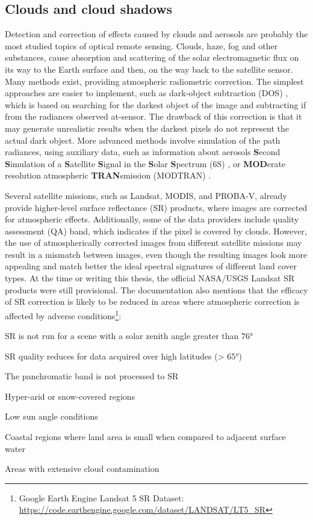 \subsection{Clouds and cloud shadows}

Detection and correction of effects caused by clouds and aerosols are probably the most studied topics of optical remote sensing. Clouds, haze, fog and other substances, cause absorption and scattering of the solar electromagnetic flux on its way to the Earth surface and then, on the way back to the satellite sensor. Many methods exist, providing atmospheric radiometric correction. The simplest approaches are easier to implement, such as dark-object subtraction (DOS) \citep{chavez1996image}, which is based on searching for the darkest object of the image and subtracting if from the radiances observed at-sensor. The drawback of this correction is that it may generate unrealistic results when the darkest pixels do not represent the actual dark object. More advanced methods involve simulation of the path radiances, using auxiliary data, such as information about aerosols \textbf{S}econd \textbf{S}imulation of a \textbf{S}atellite \textbf{S}ignal in the \textbf{S}olar \textbf{S}pectrum (6S) \citep{vermote1997second}, \citep{zhang2012improved} or \textbf{MOD}erate resolution atmospheric \textbf{TRAN}smission (MODTRAN) \citep{berk1987modtran}. 

Several satellite missions, such as Landsat, MODIS, and PROBA-V, already provide higher-level surface reflectance (SR) products, where images are corrected for atmospheric effects. Additionally, some of the data providers include quality assessment (QA) band, which indicates if the pixel is covered by clouds. However, the use of atmospherically corrected images from different satellite missions may result in a mismatch between images, even though the resulting images look more appealing and match better the ideal spectral signatures of different land cover types. At the time or writing this thesis, the official NASA/USGS Landsat SR products were still provisional. The documentation also mentions that the efficacy of SR correction is likely to be reduced in areas where atmospheric correction is affected by adverse conditions\footnote{Google Earth Engine Landsat 5 SR Dataset: \url{https://code.earthengine.google.com/dataset/LANDSAT/LT5\_SR}}:

\begin{enumerate*}[label=(\emph{\alph*})]
	\item SR is not run for a scene with a solar zenith angle greater than 76°
	\item SR quality reduces for data acquired over high latitudes (> 65°)
	\item The panchromatic band is not processed to SR
	\item Hyper-arid or snow-covered regions
	\item Low sun angle conditions
	\item Coastal regions where land area is small when compared to adjacent surface water
	\item Areas with extensive cloud contamination
\end{enumerate*}

